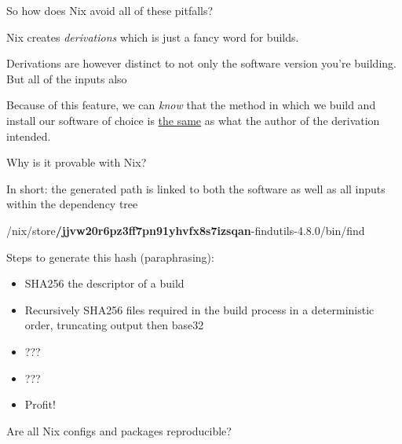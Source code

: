\documentclass{beamer}
\begin{document}
\begin{frame}
    \centering
    So how does Nix avoid all of these pitfalls?
\end{frame}

\begin{frame}
    \centering
    Nix creates \textit{derivations} which is just a fancy word for builds.
    \par\vspace{5mm}
    Derivations are however distinct to not only the software version you're building.
    But all of the inputs also
\end{frame}

\begin{frame}
    \centering
    Because of this feature, we can \textit{know} that the method in which we build and install our
    software of choice is \ul{the same} as what the author of the derivation intended.
\end{frame}

\begin{frame}
    \centering
    Why is it provable with Nix?
\end{frame}

\begin{frame}
    \centering
    In short: the generated path is linked to both the software as well as all inputs
    within the dependency tree
    \par\vspace{5mm}
    /nix/store\textbf{/jjvw20r6pz3ff7pn91yhvfx8s7izsqan}-findutils-4.8.0/bin/find
\end{frame}

\begin{frame}
    Steps to generate this hash (paraphrasing):
    \begin{itemize}
        \item SHA256 the descriptor of a build
        \item Recursively SHA256 files required in the build process in a deterministic order, truncating output then base32
        \item ???
        \item ???
        \item Profit!
    \end{itemize}
\end{frame}

\begin{frame}
    \centering
    Are all Nix configs and packages reproducible?
\end{frame}
\end{document}
